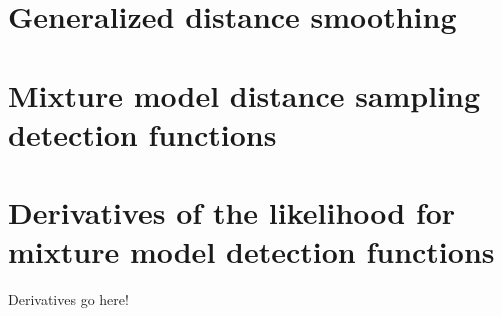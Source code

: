 \documentclass[mitthesis]{report}
\begin{document}
\chapter{Generalized distance smoothing}



\chapter{Mixture model distance sampling detection functions}



%
%
%

\appendix
\chapter{Derivatives of the likelihood for mixture model detection functions}

Derivatives go here!




\end{document}
